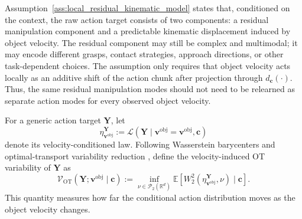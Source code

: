 \documentclass[10pt,twocolumn,letterpaper]{article}
\begin{document}
Assumption~\ref{ass:local_residual_kinematic_model} states that, conditioned on
the context, the raw action target consists of two components: a residual
manipulation component and a predictable kinematic displacement induced by
object velocity. The residual component may still be complex and multimodal; it
may encode different grasps, contact strategies, approach directions, or other
task-dependent choices. The assumption only requires that object velocity acts
locally as an additive shift of the action chunk after projection through
$d_{\mathbf c}(\cdot)$. Thus, the same residual manipulation modes should not
need to be relearned as separate action modes for every observed object
velocity.

For a generic action target $\mathbf Y$, let
\[
    \eta_{\mathbf v^{\mathrm{obj}}}^{\mathbf Y}
    :=
    \mathcal L(\mathbf Y \mid \mathbf v^{\mathrm{obj}}=\mathbf v^{\mathrm{obj}},\mathbf c)
\]
denote its velocity-conditioned law. Following Wasserstein barycenters and
optimal-transport variability reduction
\citep{agueh2011barycenters,villani2009optimal,hung2022variability}, define the
velocity-induced OT variability of $\mathbf Y$ as
\begin{equation}
    \mathcal V_{\mathrm{OT}}(\mathbf Y;\mathbf v^{\mathrm{obj}}\mid\mathbf c)
    :=
    \inf_{\nu\in\mathcal P_2(\mathbb R^d)}
    \mathbb E
    \left[
        W_2^2
        \left(
            \eta_{\mathbf v^{\mathrm{obj}}}^{\mathbf Y},
            \nu
        \right)
        \mid \mathbf c
    \right].
    \label{eq:velocity_ot_variability}
\end{equation}
This quantity measures how far the conditional action distribution moves as the
object velocity changes.
\end{document}
